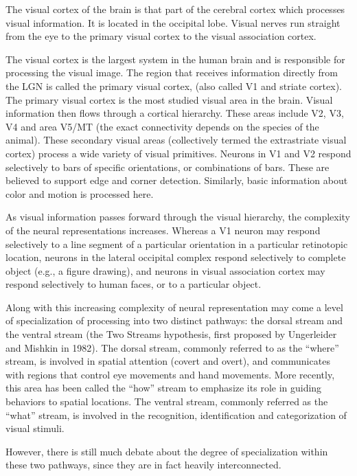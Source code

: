 The visual cortex of the brain is that part of the cerebral cortex which processes visual information. It is located in the occipital lobe. Visual nerves run straight from the eye to the primary visual cortex to the visual association cortex.

The visual cortex is the largest system in the human brain and is responsible for processing the visual image. The region that receives information directly from the LGN is called the primary visual cortex, (also called V1 and striate cortex). The primary visual cortex is the most studied visual area in the brain. Visual information then flows through a cortical hierarchy. These areas include V2, V3, V4 and area V5/MT (the exact connectivity depends on the species of the animal). These secondary visual areas (collectively termed the extrastriate visual cortex) process a wide variety of visual primitives. Neurons in V1 and V2 respond selectively to bars of specific orientations, or combinations of bars. These are believed to support edge and corner detection. Similarly, basic information about color and motion is processed here.

As visual information passes forward through the visual hierarchy, the complexity of the neural representations increases. Whereas a V1 neuron may respond selectively to a line segment of a particular orientation in a particular retinotopic location, neurons in the lateral occipital complex respond selectively to complete object (e.g., a figure drawing), and neurons in visual association cortex may respond selectively to human faces, or to a particular object.

Along with this increasing complexity of neural representation may come a level of specialization of processing into two distinct pathways: the dorsal stream and the ventral stream (the Two Streams hypothesis, first proposed by Ungerleider and Mishkin in 1982). The dorsal stream, commonly referred to as the ``where'' stream, is involved in spatial attention (covert and overt), and communicates with regions that control eye movements and hand movements. More recently, this area has been called the ``how'' stream to emphasize its role in guiding behaviors to spatial locations. The ventral stream, commonly referred as the ``what'' stream, is involved in the recognition, identification and categorization of visual stimuli.

However, there is still much debate about the degree of specialization within these two pathways, since they are in fact heavily interconnected.

